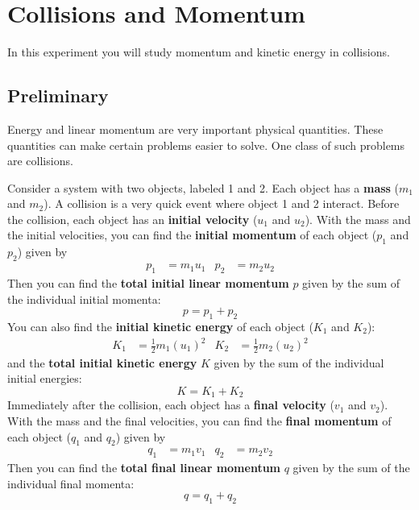 \setcounter{chapter}{8}
\chapter{Collisions and Momentum}
%
In this experiment you will study momentum and kinetic energy in collisions.
%
\section{Preliminary}
%
Energy and linear momentum are very important physical quantities. These quantities can make certain problems easier to solve. One class of such problems are collisions.

Consider a system with two objects, labeled 1 and 2. Each object has a \textbf{mass} ($m_{1}$ and $m_{2}$). A collision is a very quick event where object 1 and 2 interact. Before the collision, each object has an \textbf{initial velocity} ($u_{1}$ and $u_{2}$). With the mass and the initial velocities, you can find the \textbf{initial momentum} of each object ($p_{1}$ and $p_{2}$) given by
\begin{align}
    p_{1} &= m_{1} u_{1} & p_{2} &= m_{2} u_{2}
\end{align}
Then you can find the \textbf{total initial linear momentum} $p$ given by the sum of the individual initial momenta:
\begin{equation}
    p = p_{1} + p_{2}
\end{equation}
You can also find the \textbf{initial kinetic energy} of each object ($K_{1}$ and $K_{2}$):
\begin{align}
    K_{1} &= \frac{1}{2} m_{1} \left(u_{1}\right)^{2} & K_{2} &= \frac{1}{2} m_{2} \left(u_{2}\right)^{2}
\end{align}
and the \textbf{total initial kinetic energy} $K$ given by the sum of the individual initial energies:
\begin{equation}
    K = K_{1} + K_{2}
\end{equation}
Immediately after the collision, each object has a \textbf{final velocity} ($v_{1}$ and $v_{2}$). With the mass and the final velocities, you can find the \textbf{final momentum} of each object ($q_{1}$ and $q_{2}$) given by
\begin{align}
    q_{1} &= m_{1} v_{1} & q_{2} &= m_{2} v_{2}
\end{align}
Then you can find the \textbf{total final linear momentum} $q$ given by the sum of the individual final momenta:
\begin{equation}
    q = q_{1} + q_{2}
\end{equation}
